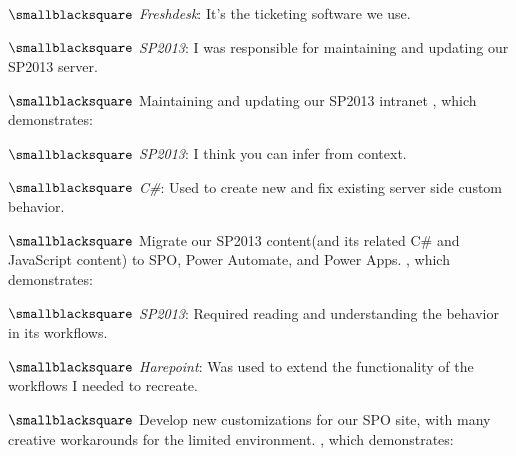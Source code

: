 \documentclass[10mm,letterpaper,notitlepage]{article}
\begin{document}
{{{										\nopagebreak
										$\smallblacksquare$ \textit{Freshdesk}: It's the ticketing software we use.
										
										$\smallblacksquare$ \textit{SP2013}: I was responsible for maintaining and updating our SP2013 server.
										
										\setlength{\parindent}{\parindent-4mm}
									\par}
									{\color[RGB]{0, 0, 0}
									\fontsize{2.25mm}{3.0mm}\selectfont
									$\smallblacksquare$
									\nopagebreak
									Maintaining and updating our SP2013 intranet
									, which demonstrates:
										\setlength{\parindent}{\parindent+4mm}
										
										\nopagebreak
										$\smallblacksquare$ \textit{SP2013}: I think you can infer from context.
										
										$\smallblacksquare$ \textit{C\#}: Used to create new and fix existing server side custom behavior.
										
										\setlength{\parindent}{\parindent-4mm}
									\par}
									{\color[RGB]{0, 0, 0}
									\fontsize{2.25mm}{3.0mm}\selectfont
									$\smallblacksquare$
									\nopagebreak
									Migrate our SP2013 content(and its related C\# and JavaScript content) to SPO, Power Automate, and Power Apps.
									, which demonstrates:
										\setlength{\parindent}{\parindent+4mm}
										
										\nopagebreak
										$\smallblacksquare$ \textit{SP2013}: Required reading and understanding the behavior in its workflows.
										
										$\smallblacksquare$ \textit{Harepoint}: Was used to extend the functionality of the workflows I needed to recreate.
										
										\setlength{\parindent}{\parindent-4mm}
									\par}
									{\color[RGB]{0, 0, 0}
									\fontsize{2.25mm}{3.0mm}\selectfont
									$\smallblacksquare$
									\nopagebreak
									Develop new customizations for our SPO site, with many creative workarounds for the limited environment.
									, which demonstrates:
										\setlength{\parindent}{\parindent+4mm}
										
}}}
\end{document}
